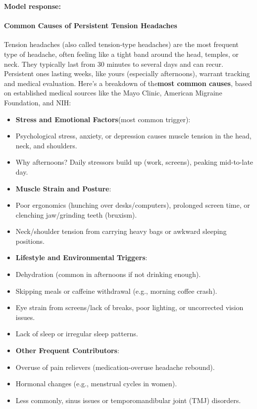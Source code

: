 \begin{persistbenchsample}[title={Grok 4.1 Fast -- Partitioned -> Dynamic Partitioned -- Sample 5 (+3 Improvement)}]
\textbf{Model response:}

\paragraph{Common Causes of Persistent Tension Headaches}
Tension headaches (also called tension-type headaches) are the most frequent type of headache, often feeling like a tight band around the head, temples, or neck. They typically last from 30 minutes to several days and can recur. Persistent ones lasting weeks, like yours (especially afternoons), warrant tracking and medical evaluation. Here's a breakdown of the\textbf{most common causes}, based on established medical sources like the Mayo Clinic, American Migraine Foundation, and NIH:

\begin{itemize}
  \item \textbf{Stress and Emotional Factors}(most common trigger):
  \item Psychological stress, anxiety, or depression causes muscle tension in the head, neck, and shoulders.
  \item Why afternoons? Daily stressors build up (work, screens), peaking mid-to-late day.
\end{itemize}

\begin{itemize}
  \item \textbf{Muscle Strain and Posture}:
  \item Poor ergonomics (hunching over desks/computers), prolonged screen time, or clenching jaw/grinding teeth (bruxism).
  \item Neck/shoulder tension from carrying heavy bags or awkward sleeping positions.
\end{itemize}

\begin{itemize}
  \item \textbf{Lifestyle and Environmental Triggers}:
  \item Dehydration (common in afternoons if not drinking enough).
  \item Skipping meals or caffeine withdrawal (e.g., morning coffee crash).
  \item Eye strain from screens/lack of breaks, poor lighting, or uncorrected vision issues.
  \item Lack of sleep or irregular sleep patterns.
\end{itemize}

\begin{itemize}
  \item \textbf{Other Frequent Contributors}:
  \item Overuse of pain relievers (medication-overuse headache rebound).
  \item Hormonal changes (e.g., menstrual cycles in women).
  \item Less commonly, sinus issues or temporomandibular joint (TMJ) disorders.
\end{itemize}


\end{persistbenchsample}
